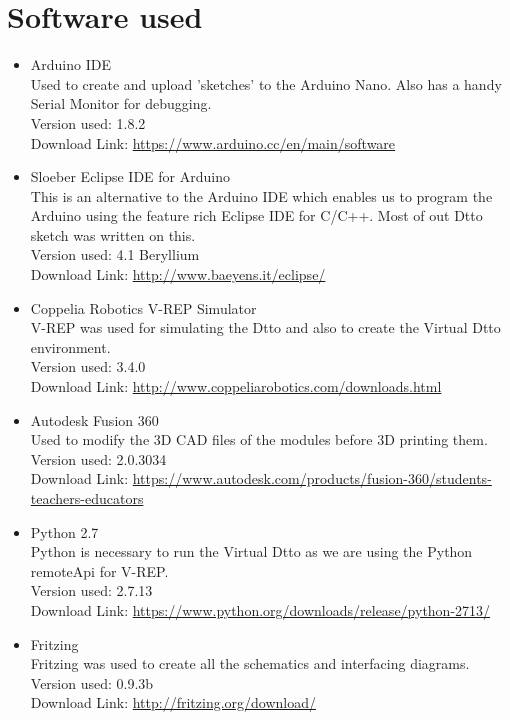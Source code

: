 \documentclass[a4paper,12pt,oneside]{book}
\begin{document}
\pagebreak

\section{Software used}
\begin{itemize}
\item Arduino IDE \\
Used to create and upload 'sketches' to the Arduino Nano. Also has a handy Serial Monitor for debugging.
\\Version used: 1.8.2
\\Download Link: \href{https://www.arduino.cc/en/main/software}{https://www.arduino.cc/en/main/software} 

\item Sloeber Eclipse IDE for Arduino\\
This is an alternative to the Arduino IDE which enables us to program the Arduino using the feature rich Eclipse IDE for C/C++. Most of out Dtto sketch was written on this.
\\Version used: 4.1 Beryllium
\\Download Link: \href{http://www.baeyens.it/eclipse/}{http://www.baeyens.it/eclipse/} 

\item Coppelia Robotics V-REP Simulator\\
V-REP was used for simulating the Dtto and also to create the Virtual Dtto environment.
\\Version used: 3.4.0
\\Download Link: \href{http://www.coppeliarobotics.com/downloads.html}{http://www.coppeliarobotics.com/downloads.html} 

\item Autodesk Fusion 360 \\
Used to modify the 3D CAD files of the modules before 3D printing them.
\\Version used: 2.0.3034
\\Download Link: \href{https://www.autodesk.com/products/fusion-360/students-teachers-educators}{https://www.autodesk.com/products/fusion-360/students-teachers-educators} 

\item Python 2.7\\
Python is necessary to run the Virtual Dtto as we are using the Python remoteApi for V-REP.
\\Version used: 2.7.13
\\Download Link: \href{https://www.python.org/downloads/release/python-2713/}{https://www.python.org/downloads/release/python-2713/} 

\item Fritzing\\
Fritzing was used to create all the schematics and interfacing diagrams.
\\Version used: 0.9.3b
\\Download Link: \href{http://fritzing.org/download/}{http://fritzing.org/download/}

\end{itemize}
\end{document}
